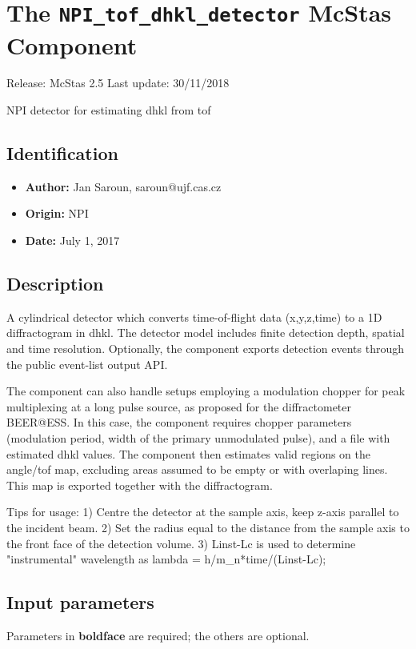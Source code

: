\section{The \texttt{NPI\_tof\_dhkl\_detector} McStas Component}
Release: McStas 2.5
Last update: 30/11/2018

NPI detector for estimating dhkl from tof

\subsection*{Identification}
\begin{itemize}
  \item \textbf{Author:} Jan Saroun, saroun@ujf.cas.cz
  \item \textbf{Origin:} NPI
  \item \textbf{Date:} July 1, 2017
\end{itemize}

\subsection*{Description}
A cylindrical detector which converts time-of-flight data (x,y,z,time) to a 1D diffractogram in dhkl. The detector model includes finite detection depth, spatial and time resolution. Optionally, the component exports detection events through the public event-list output API.

The component can also handle setups employing a modulation chopper for peak multiplexing at a long pulse source, as proposed for the diffractometer BEER@ESS. In this case, the component requires chopper parameters (modulation period, width of the primary unmodulated pulse), and a file with estimated dhkl values. The component then estimates valid regions on the angle/tof map, excluding areas assumed to be empty or with overlaping lines. This map is exported together with the diffractogram.

Tips for usage: 1) Centre the detector at the sample axis, keep z-axis parallel to the incident beam. 2) Set the radius equal to the distance from the sample axis to the front face of the detection volume. 3) Linst-Lc is used to determine "instrumental" wavelength as lambda = h/m\_n*time/(Linst-Lc);

\subsection*{Input parameters}
Parameters in \textbf{boldface} are required; the others are optional.

